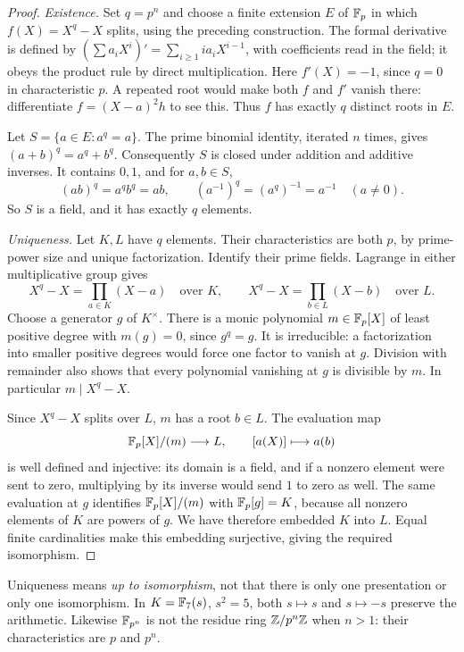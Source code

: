 \begin{proof}
\emph{Existence.} Set $q=p^n$ and choose a finite extension $E$ of $\mathbb F_p$
in which $f(X)=X^q-X$ splits, using the preceding construction.
The formal derivative is defined by
$(\sum a_iX^i)'=\sum_{i\ge1}i a_iX^{i-1}$, with coefficients read in
the field; it obeys the product rule by direct multiplication.
Here $f'(X)=-1$, since $q=0$ in characteristic $p$.
A repeated root would make both $f$ and $f'$ vanish there: differentiate
$f=(X-a)^2h$ to see this. Thus $f$ has exactly $q$ distinct roots in $E$.

Let $S=\{a\in E:a^q=a\}$. The prime binomial identity, iterated $n$
times, gives $(a+b)^q=a^q+b^q$. Consequently $S$ is closed under
addition and additive inverses. It contains $0,1$, and for $a,b\in S$,
\[
(ab)^q=a^qb^q=ab,\qquad (a^{-1})^q=(a^q)^{-1}=a^{-1}\quad(a\ne0).
\]
So $S$ is a field, and it has exactly $q$ elements.

\emph{Uniqueness.} Let $K,L$ have $q$ elements. Their characteristics
are both $p$, by prime-power size and unique factorization. Identify
their prime fields. Lagrange in either multiplicative group gives
\[
X^q-X=\prod_{a\in K}(X-a)\quad\text{over }K,
\qquad
X^q-X=\prod_{b\in L}(X-b)\quad\text{over }L.
\]
Choose a generator $g$ of $K^\times$. There is a monic polynomial
$m\in\mathbb F_p[X]$ of least positive degree with $m(g)=0$, since
$g^q=g$. It is irreducible: a factorization into smaller positive
degrees would force one factor to vanish at $g$. Division with remainder
also shows that every polynomial vanishing at $g$ is divisible by $m$.
In particular $m\mid X^q-X$.

Since $X^q-X$ splits over $L$, $m$ has a root $b\in L$.
The evaluation map
\[
\mathbb F_p[X]/(m)\longrightarrow L,\qquad [a(X)]\longmapsto a(b)
\]
is well defined and injective: its domain is a field, and if a nonzero
element were sent to zero, multiplying by its inverse would send $1$
to zero as well. The same evaluation at
$g$ identifies $\mathbb F_p[X]/(m)$ with $\mathbb F_p[g]=K$, because all nonzero
elements of $K$ are powers of $g$. We have therefore embedded $K$
into $L$. Equal finite cardinalities make this embedding surjective,
giving the required isomorphism.
\end{proof}

\begin{warningbox}
Uniqueness means \emph{up to isomorphism}, not that there is only one
presentation or only one isomorphism. In
$K=\mathbb F_7(s)$, $s^2=5$, both $s\mapsto s$ and $s\mapsto-s$ preserve
the arithmetic. Likewise $\mathbb F_{p^n}$ is not the residue ring
$\mathbb Z/p^n\mathbb Z$ when $n>1$: their characteristics are $p$ and $p^n$.
\end{warningbox}

